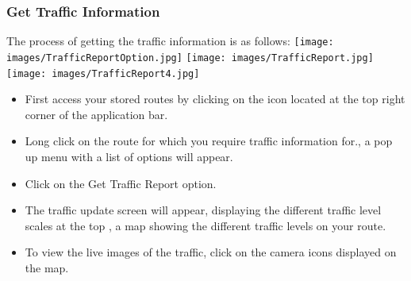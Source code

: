 \documentclass[a4paper,12pt]{article}
\begin{document}
\subsubsection{Get Traffic Information}
The process of getting the traffic information is as follows:
\texttt{[image: images/TrafficReportOption.jpg]}
\texttt{[image: images/TrafficReport.jpg]}
\texttt{[image: images/TrafficReport4.jpg]}
\begin{itemize}
    \item First access your stored routes by  clicking on the icon located at the top right corner of the application bar. 
    \item Long click on the route for which you require traffic information for., a pop up menu with a list of options will appear.
    \item Click on the Get Traffic Report option.
    \item The traffic update screen will appear, displaying the different traffic level scales at the top , a map showing the different   traffic levels on your route. 
    \item To view the live images of the traffic, click on the camera icons displayed on the map.
\end{itemize}
\end{document}
